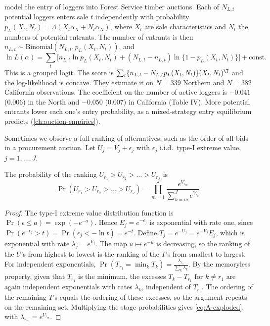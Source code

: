 \citet{AtheyLevinSeira2011} model the entry of loggers into Forest Service timber auctions. Each of $N_{L,t}$ potential
loggers enters sale $t$ independently with probability $p_L(X_t, N_t) = \Lambda(X_t\alpha_X + N_t\alpha_N)$, where $X_t$ are
sale characteristics and $N_t$ the numbers of potential entrants. The number of entrants is then
$n_{L,t} \sim \mathrm{Binomial}(N_{L,t}, p_L(X_t, N_t))$, and
\begin{equation*}
  \ln L(\alpha) = \sum_t\Big[n_{L,t}\ln p_L(X_t, N_t) + (N_{L,t} - n_{L,t})\ln\{1 - p_L(X_t, N_t)\}\Big] + \text{const}.
\end{equation*}
This is a grouped logit. The score is $\sum_t\{n_{L,t} - N_{L,t}p_L(X_t, N_t)\}(X_t, N_t)^\T$ and the log-likelihood is
concave. They estimate it on $N = 339$ Northern and $N = 382$ California observations. The coefficient on the number of
active loggers is $-0.041$ (0.006) in the North and $-0.050$ (0.007) in California (Table IV). More potential entrants
lower each one's entry probability, as a mixed-strategy entry equilibrium predicts (\cref{ch:auction-empirics}).

Sometimes we observe a full ranking of alternatives, such as the order of all bids in a procurement auction. Let
$U_j = V_j + \epsilon_j$ with $\epsilon_j$ i.i.d.\ type-I extreme value, $j = 1, \dots, J$.

\begin{proposition}\label{prop:A-exploded-logit}
The probability of the ranking $U_{r_1} > U_{r_2} > \dots > U_{r_J}$ is
\begin{equation}\label{eq:A-exploded}
  \Pr(U_{r_1} > U_{r_2} > \dots > U_{r_J}) = \prod_{m=1}^{J}\frac{e^{V_{r_m}}}{\sum_{k=m}^Je^{V_{r_k}}}.
\end{equation}
\end{proposition}

\begin{proof}
The type-I extreme value distribution function is $\Pr(\epsilon \le a) = \exp(-e^{-a})$. Hence $E_j = e^{-\epsilon_j}$ is
exponential with rate one, since $\Pr(e^{-\epsilon_j} > t) = \Pr(\epsilon_j < -\ln t) = e^{-t}$. Define
$T_j = e^{-U_j} = e^{-V_j}E_j$, which is exponential with rate $\lambda_j = e^{V_j}$. The map $u \mapsto e^{-u}$ is
decreasing, so the ranking of the $U$'s from highest to lowest is the ranking of the $T$'s from smallest to largest. For
independent exponentials, $\Pr(T_{r_1} = \min_kT_k) = \frac{\lambda_{r_1}}{\sum_k\lambda_k}$. By the memoryless property, given
that $T_{r_1}$ is the minimum, the excesses $T_k - T_{r_1}$ for $k \ne r_1$ are again independent exponentials with rates
$\lambda_k$, independent of $T_{r_1}$. The ordering of the remaining $T$'s equals the ordering of these excesses, so the
argument repeats on the remaining set. Multiplying the stage probabilities gives \eqref{eq:A-exploded}, with
$\lambda_{r_m} = e^{V_{r_m}}$.
\end{proof}


